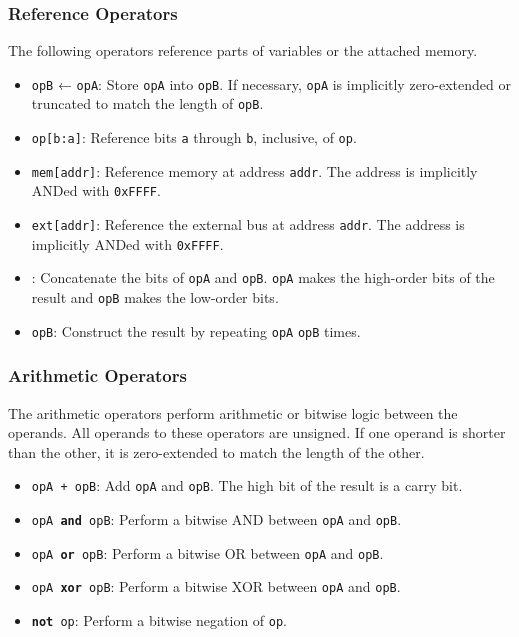 \documentclass[12pt,a4paper]{article}
\begin{document}
\subsubsection{Reference Operators}
The following operators reference parts of variables or the attached memory.

\begin{itemize}
  \item \texttt{opB} ← \texttt{opA}: Store \texttt{opA} into \texttt{opB}. If necessary, \texttt{opA} is implicitly zero-extended or truncated to match the length of \texttt{opB}.
  \item \texttt{op[b:a]}: Reference bits \texttt{a} through \texttt{b}, inclusive, of \texttt{op}.
  \item \texttt{mem[addr]}: Reference memory at address \texttt{addr}. The address is implicitly ANDed with \texttt{0xFFFF}.
  \item \texttt{ext[addr]}: Reference the external bus at address \texttt{addr}. The address is implicitly ANDed with \texttt{0xFFFF}.
  \item \texttt{}: Concatenate the bits of \texttt{opA} and \texttt{opB}. \texttt{opA} makes the high-order bits of the result and \texttt{opB} makes the low-order bits.
  \item \texttt{opB}: Construct the result by repeating \texttt{opA} \texttt{opB} times.
\end{itemize}

\subsubsection{Arithmetic Operators}
The arithmetic operators perform arithmetic or bitwise logic between the operands. All operands to these operators are unsigned. If one operand is shorter than the other, it is zero-extended to match the length of the other.

\begin{itemize}
  \item \texttt{opA + opB}: Add \texttt{opA} and \texttt{opB}. The high bit of the result is a carry bit.
  \item \texttt{opA \textbf{and} opB}: Perform a bitwise AND between \texttt{opA} and \texttt{opB}.
  \item \texttt{opA \textbf{or} opB}: Perform a bitwise OR between \texttt{opA} and \texttt{opB}.
  \item \texttt{opA \textbf{xor} opB}: Perform a bitwise XOR between \texttt{opA} and \texttt{opB}.
  \item \texttt{\textbf{not} op}: Perform a bitwise negation of \texttt{op}.
\end{itemize}
\end{document}
